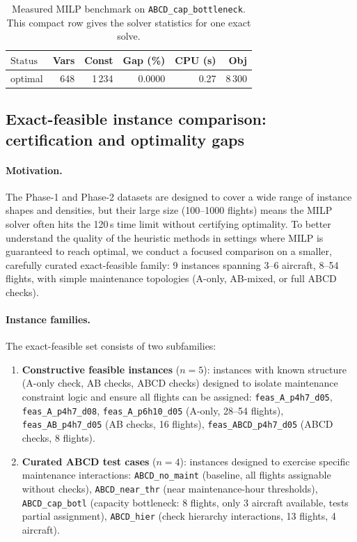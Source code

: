 \begin{table}[t]
\centering\small
\caption{Measured MILP benchmark on \texttt{ABCD\_cap\_bottleneck}.
  This compact row gives the solver statistics for one exact solve.}
\label{tab:repro5}
\begin{tabular}{l r r r r r}
\toprule
$\text{Status}$ & Vars & Const & Gap (\%) & CPU (s) & Obj \\
\midrule
optimal & 648 & 1\,234 & 0.0000 & 0.27 & 8\,300 \\
\bottomrule
\end{tabular}
\end{table}

\subsection{Exact-feasible instance comparison: certification and optimality gaps}
\label{subsec:exact_feasible_comp}

\paragraph{Motivation.}
The Phase-1 and Phase-2 datasets are designed to cover a wide range of instance
shapes and densities, but their large size (100--1000 flights) means the MILP
solver often hits the 120\,s time limit without certifying optimality. To better
understand the quality of the heuristic methods in settings where MILP is
guaranteed to reach optimal, we conduct a focused comparison on a smaller,
carefully curated exact-feasible family: 9 instances spanning 3--6 aircraft,
8--54 flights, with simple maintenance topologies (A-only, AB-mixed, or full
ABCD checks).

\paragraph{Instance families.}
The exact-feasible set consists of two subfamilies:
\begin{enumerate}
  \item \textbf{Constructive feasible instances} ($n=5$): instances with known
    structure (A-only check, AB checks, ABCD checks) designed to isolate
    maintenance constraint logic and ensure all flights can be assigned:
    \texttt{feas\_A\_p4h7\_d05}, \texttt{feas\_A\_p4h7\_d08},
    \texttt{feas\_A\_p6h10\_d05} (A-only, 28--54 flights),
    \texttt{feas\_AB\_p4h7\_d05} (AB checks, 16 flights),
    \texttt{feas\_ABCD\_p4h7\_d05} (ABCD checks, 8 flights).
  \item \textbf{Curated ABCD test cases} ($n=4$): instances designed to exercise
    specific maintenance interactions:
    \texttt{ABCD\_no\_maint} (baseline, all flights assignable without checks),
    \texttt{ABCD\_near\_thr} (near maintenance-hour thresholds),
    \texttt{ABCD\_cap\_botl} (capacity bottleneck: 8 flights, only 3 aircraft
    available, tests partial assignment), \texttt{ABCD\_hier} (check hierarchy
    interactions, 13 flights, 4 aircraft).
\end{enumerate}


